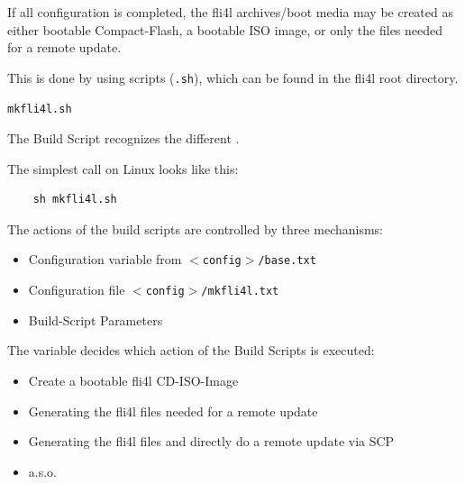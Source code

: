 

  If all configuration is completed, the fli4l archives/boot media may be created
  as either bootable Compact-Flash, a bootable ISO image, or only the files needed
  for a remote update.


  This is done by using scripts (\texttt{.sh}), which can be found in the
  fli4l root directory.

  \begin{description}
    \item \texttt{mkfli4l.sh}
  \end{description}

  The Build Script recognizes the different .

  The simplest call on Linux looks like this:
   \begin{verbatim}
    sh mkfli4l.sh
  \end{verbatim}

  The actions of the build scripts are controlled by three mechanisms:
   \begin{itemize}
    \item Configuration variable  from
          \texttt{$<$config$>$/base.txt}
    \item Configuration file \texttt{$<$config$>$/mkfli4l.txt}
    \item Build-Script Parameters
  \end{itemize}

  The variable 
  decides which action of the Build Scripts is executed:
  \begin{itemize}
    \item Create a bootable fli4l CD-ISO-Image
    \item Generating the fli4l files needed for a remote update
    \item Generating the fli4l files and directly do a remote update via SCP
    \item a.s.o.
  \end{itemize}

